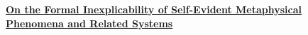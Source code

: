 \documentclass[runningheads]{llncs}
\newcommand{\hidden}[2]{\href{#1}{#2}}
\newcommand{\Title}[0]{%
\hidden{https://github.com/DNA-Platform/inexplicable-phenomena}{On the Formal Inexplicability of Self-Evident
Metaphysical Phenomena and Related Systems}%
}
\begin{document}
\begin{center}
	{\Large\bfseries\boldmath
		\Title
		\par}
	\vskip 0.8cm
\end{center}
\end{document}
